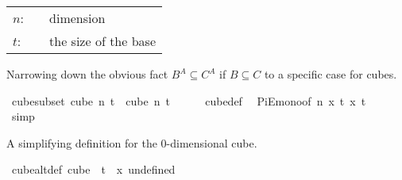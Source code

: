 \begin{isabellebody}
\begin{isamarkuptext}
\begin{tabular}{lcp{8cm}}
$n$:& \isa{nat}& dimension\\
$t$:&  \isa{nat}& the size of the base\\
\end{tabular}%
\end{isamarkuptext}\isamarkuptrue%
%
\begin{isamarkuptext}%
Narrowing down the obvious fact $B^A \subseteq C^A$ if $B \subseteq C$ to a specific case for cubes.%
\end{isamarkuptext}\isamarkuptrue%
\isamarkupfalse%
\ cube{\isacharunderscore}{\kern0pt}subset{\isacharcolon}{\kern0pt}\ {\isachardoublequoteopen}cube\ n\ t\ {\isasymsubseteq}\ cube\ n\ {\isacharparenleft}{\kern0pt}t\ {\isacharplus}{\kern0pt}\ {}{\isacharparenright}{\kern0pt}{\isachardoublequoteclose}\isanewline
%
\isadelimproof
\ \ %
\endisadelimproof
%
\isatagproof
{}\isamarkupfalse%
\ cube{\isacharunderscore}{\kern0pt}def\ \isamarkupfalse%
\ PiE{\isacharunderscore}{\kern0pt}mono{\isacharbrackleft}{\kern0pt}of\ {\isachardoublequoteopen}{\isacharbraceleft}{\kern0pt}{\isachardot}{\kern0pt}{\isachardot}{\kern0pt}{\isacharless}{\kern0pt}n{\isacharbraceright}{\kern0pt}{\isachardoublequoteclose}\ {\isachardoublequoteopen}{\isasymlambda}x{\isachardot}{\kern0pt}\ {\isacharbraceleft}{\kern0pt}{\isachardot}{\kern0pt}{\isachardot}{\kern0pt}{\isacharless}{\kern0pt}t{\isacharbraceright}{\kern0pt}{\isachardoublequoteclose}\ {\isachardoublequoteopen}{\isasymlambda}x{\isachardot}{\kern0pt}\ {\isacharbraceleft}{\kern0pt}{\isachardot}{\kern0pt}{\isachardot}{\kern0pt}{\isacharless}{\kern0pt}t{\isacharplus}{\kern0pt}{}{\isacharbraceright}{\kern0pt}{\isachardoublequoteclose}{\isacharbrackright}{\kern0pt}\isanewline
\ \ \isamarkupfalse%
\ simp%
\endisatagproof
{\isafoldproof}%
%
\isadelimproof
%
\endisadelimproof
%
\begin{isamarkuptext}%
A simplifying definition for the 0-dimensional cube.%
\end{isamarkuptext}\isamarkuptrue%
\isamarkupfalse%
\ cube{}{\isacharunderscore}{\kern0pt}alt{\isacharunderscore}{\kern0pt}def{\isacharcolon}{\kern0pt}\ {\isachardoublequoteopen}cube\ {}\ t\ {\isacharequal}{\kern0pt}\ {\isacharbraceleft}{\kern0pt}{\isasymlambda}x{\isachardot}{\kern0pt}\ undefined{\isacharbraceright}{\kern0pt}{\isachardoublequoteclose}\isanewline
%
\isadelimproof
\ \ %
\endisadelimproof
%
\isatagproof
{}\isamarkupfalse%

\end{isabellebody}
